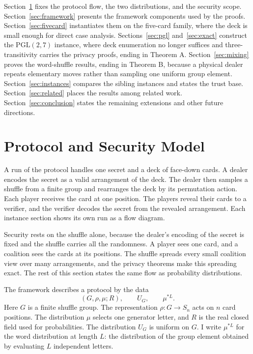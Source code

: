 \documentclass[runningheads]{llncs}
\newcommand{\PG}{\mathrm{PGL}(2,7)}
\begin{document}
Section~\ref{sec:model} fixes the protocol flow, the two distributions, and
the security scope. Section~\ref{sec:framework} presents the framework components used by
the proofs. Section~\ref{sec:fivecard} instantiates them on the five-card
family, where the deck is small enough for direct case analysis.
Sections~\ref{sec:pgl} and~\ref{sec:exact} construct the $\PG$ instance,
where deck enumeration no longer suffices and three-transitivity carries
the privacy proofs, ending in Theorem A. Section~\ref{sec:mixing} proves
the word-shuffle results, ending in Theorem B, because a physical dealer
repeats elementary moves rather than sampling one uniform group element. Section~\ref{sec:instances} compares the sibling instances and
states the trust base. Section~\ref{sec:related} places the results among
related work. Section~\ref{sec:conclusion} states the remaining extensions
and other future directions.

\section{Protocol and Security Model}\label{sec:model}

A run of the protocol handles one secret and a deck of face-down cards. A
dealer encodes the secret as a valid arrangement of the deck. The dealer
then samples a shuffle from a finite group and rearranges the deck by its
permutation action. Each player receives the card at one position. The
players reveal their cards to a verifier, and the verifier decodes the
secret from the revealed arrangement. Each instance section shows its own
run as a flow diagram.

Security rests on the shuffle alone, because the dealer's encoding of
the secret is fixed and the shuffle carries all the randomness. A player
sees one card, and a coalition sees the cards at its positions. The shuffle spreads every small
coalition view over many arrangements, and the privacy theorems make this
spreading exact. The rest of this section states the same flow as
probability distributions.

The framework describes a protocol by the data
\begin{equation}
  (G,\rho,\mu;R), \qquad U_G, \qquad \mu^{*L}.
  \label{eq:model-data}
\end{equation}
Here $G$ is a finite shuffle group. The representation
$\rho:G\to S_n$ acts on $n$ card positions. The distribution $\mu$ selects one
generator letter, and $R$ is the real closed field used for probabilities.
The distribution $U_G$ is uniform on $G$. I write $\mu^{*L}$ for the word distribution at length $L$: the
distribution of the group element obtained by evaluating $L$ independent
letters.
\end{document}
